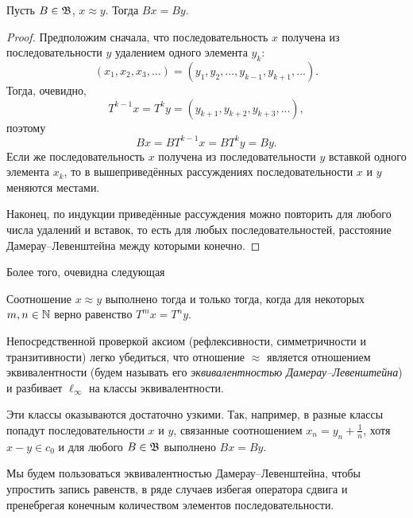 \begin{lemma}
	Пусть $B\in\mathfrak{B}$, $x\approx y$.
	Тогда $Bx=By$.
\end{lemma}

\begin{proof}
	Предположим сначала, что последовательность $x$ получена из последовательности $y$ удалением одного элемента $y_k$:
	\begin{equation}
		(x_1, x_2, x_3,...) = (y_1, y_2, ..., y_{k-1}, y_{k+1}, ...)
		.
	\end{equation}
	Тогда, очевидно,
	\begin{equation}
		T^{k-1} x = T^{k}y = (y_{k+1}, y_{k+2}, y_{k+3}, ...)
		,
	\end{equation}
	поэтому
	\begin{equation}
		Bx = BT^{k-1}x = BT^{k}y = By
		.
	\end{equation}
	Если же последовательность $x$ получена из последовательности $y$ вставкой одного элемента $x_k$,
	то в вышеприведённых рассуждениях последовательности $x$ и $y$ меняются местами.

	Наконец, по индукции приведённые рассуждения можно повторить для любого числа удалений и вставок,
	то есть для любых последовательностей, расстояние Дамерау--Левенштейна между которыми конечно.
\end{proof}

Более того, очевидна следующая
\begin{lemma}
	Соотношение $x\approx y$ выполнено тогда и только тогда, когда для некоторых $m,n\in\mathbb{N}$ верно равенство $T^m x = T^n y$.
\end{lemma}

Непосредственной проверкой аксиом (рефлексивности, симметричности и транзитивности) легко убедиться,
что отношение $\approx$ является отношением эквивалентности (будем называть его \emph{эквивалентностью Дамерау--Левенштейна})
и разбивает $\ell_\infty$ на классы эквивалентности.

\begin{remark}
	\label{rem:Damerau_vs_c0}
	Эти классы оказываются достаточно узкими.
	Так, например, в разные классы попадут последовательности $x$ и $y$, связанные соотношением $x_n = y_n + \frac1n$,
	хотя $x-y \in c_0$ и для любого $B\in\mathfrak{B}$ выполнено $Bx=By$.
\end{remark}

Мы будем пользоваться эквивалентностью Дамерау--Левенштейна, чтобы упростить запись равенств,
в ряде случаев избегая оператора сдвига и пренебрегая конечным количеством элементов последовательности.
